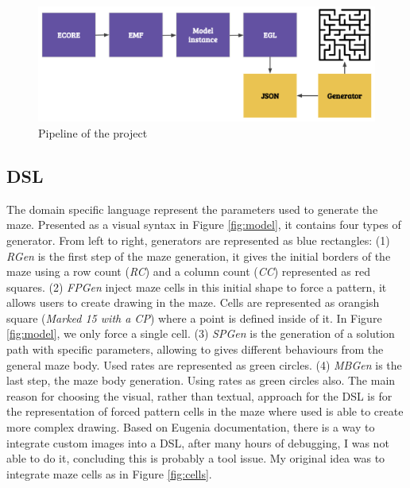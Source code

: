 \documentclass[review]{elsarticle}
\begin{document}
\begin{figure}
	\includegraphics[width=\linewidth]{overview.png}
	\caption{Pipeline of the project}
	\label{fig:overview}
\end{figure}

\subsection{DSL}
The domain specific language represent the parameters used to generate the maze. Presented as a visual syntax in Figure \ref{fig:model}, it contains four types of generator. From left to right, generators are represented as blue rectangles: (1) \textit{RGen} is the first step of the maze generation, it gives the initial borders of the maze using a row count (\textit{RC}) and a column count (\textit{CC}) represented as red squares. (2) \textit{FPGen} inject maze cells in this initial shape to force a pattern, it allows users to create drawing in the maze. Cells are represented as orangish square (\textit{Marked 15 with a CP}) where a point is defined inside of it. In Figure \ref{fig:model}, we only force a single cell. (3) \textit{SPGen} is the generation of a solution path with specific parameters, allowing to gives different behaviours from the general maze body. Used rates are represented as green circles. (4) \textit{MBGen} is the last step, the maze body generation. Using rates as green circles also. The main reason for choosing the visual, rather than textual, approach for the DSL  is for the representation of forced pattern cells in the maze where used is able to create more complex drawing. Based on Eugenia documentation\cite{noauthor_eugenia_nodate}, there is a way to integrate custom images into a DSL, after many hours of debugging, I was not able to do it, concluding this is probably a tool issue. My original idea was to integrate maze cells as in Figure \ref{fig:cells}.
\end{document}
